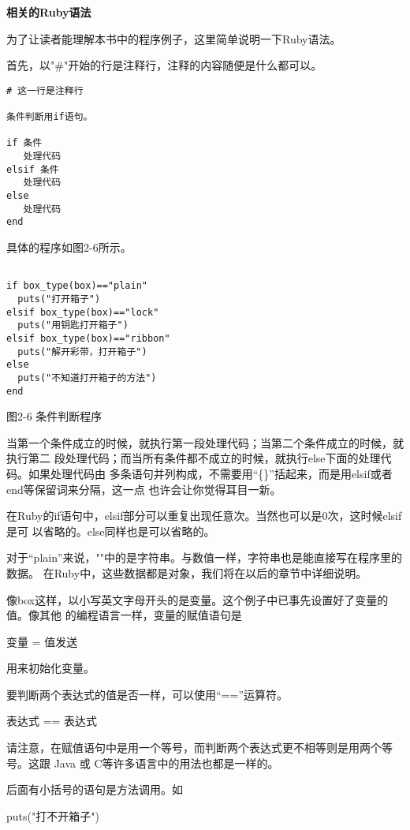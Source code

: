 \documentclass[11pt]{ctexart}
\begin{document}
\textbf{相关的Ruby语法}

为了让读者能理解本书中的程序例子，这里简单说明一下Ruby语法。

首先，以"\#"开始的行是注释行，注释的内容随便是什么都可以。



\lstset{language=org,label= ,caption= ,captionpos=b,numbers=none}
\begin{lstlisting}
# 这一行是注释行

条件判断用if语句。

if 条件
   处理代码
elsif 条件 
   处理代码
else
   处理代码
end
\end{lstlisting}

具体的程序如图2-6所示。

\lstset{language=org,label= ,caption= ,captionpos=b,numbers=none}
\begin{lstlisting}

if box_type(box)=="plain"
  puts("打开箱子")
elsif box_type(box)=="lock"
  puts("用钥匙打开箱子")
elsif box_type(box)=="ribbon"
  puts("解开彩带，打开箱子")
else
  puts("不知道打开箱子的方法")
end

\end{lstlisting}
图2-6 条件判断程序

当第一个条件成立的时候，就执行第一段处理代码；当第二个条件成立的时候，就执行第二
段处理代码；而当所有条件都不成立的时候，就执行else下面的处理代码。如果处理代码由
多条语句并列构成，不需要用“\{\}”括起来，而是用elsif或者end等保留词来分隔，这一点
也许会让你觉得耳目一新。

在Ruby的if语句中，elsif部分可以重复出现任意次。当然也可以是0次，这时候elsif是可
以省略的。else同样也是可以省略的。

对于“plain”来说，""中的是字符串。与数值一样，字符串也是能直接写在程序里的数据。
在Ruby中，这些数据都是对象，我们将在以后的章节中详细说明。

像box这样，以小写英文字母开头的是变量。这个例子中已事先设置好了变量的值。像其他
的编程语言一样，变量的赋值语句是

变量 = 值发送

用来初始化变量。

要判断两个表达式的值是否一样，可以使用“==”运算符。

表达式 == 表达式

请注意，在赋值语句中是用一个等号，而判断两个表达式更不相等则是用两个等号。这跟
Java 或 C等许多语言中的用法也都是一样的。

后面有小括号的语句是方法调用。如

puts("打不开箱子")
\end{document}
